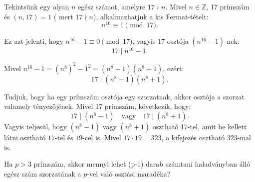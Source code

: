 \begin{solution}
	Tekintsünk egy olyan $n$ egész számot, amelyre $17\nmid n$. Mivel
	$n\in\mathbb{Z}$, 17 prímszám és $(n,17)=1$ ( mert $17\nmid n$),
	alkalmazhatjuk a kis Fermat-tételt: 
	\[
	n^{16}\equiv1\pmod{17}.
	\]
	
	Ez azt jelenti, hogy $n^{16}-1\equiv0\pmod{17}$, vagyis $17$ osztója
	$(n^{16}-1)$-nek: 
	\[
	17\mid n^{16}-1.
	\]
	
	Mivel $n^{16}-1=(n^{8})^{2}-1^{2}=(n^{8}-1)(n^{8}+1)$, ezért: 
	\[
	17\mid(n^{8}-1)(n^{8}+1).
	\]
	
	Tudjuk, hogy ha egy prímszám osztója egy szorzatnak, akkor osztója
	a szorzat valamely tényezőjének. Mivel 17 prímszám, következik, hogy:
	\[
	17\mid(n^{8}-1)\quad\text{vagy}\quad17\mid(n^{8}+1).
	\]
	Vagyis teljesül, hogy $(n^{8}-1)$ vagy $(n^{8}+1)$ osztható 17-tel,
	amit be kellett látni.osztható $17$-tel és $19$-cel is. Mivel $17\cdot19=323$,
	a kifejezés osztható $323$-mal is. 
\end{solution}
\begin{extraproblem}
	Ha $p>3$ prímszám, akkor mennyi lehet (p-1) darab számtani haladványban
	álló egész szám szorzatának a $p$-vel való osztási maradéka? 
\end{extraproblem}

